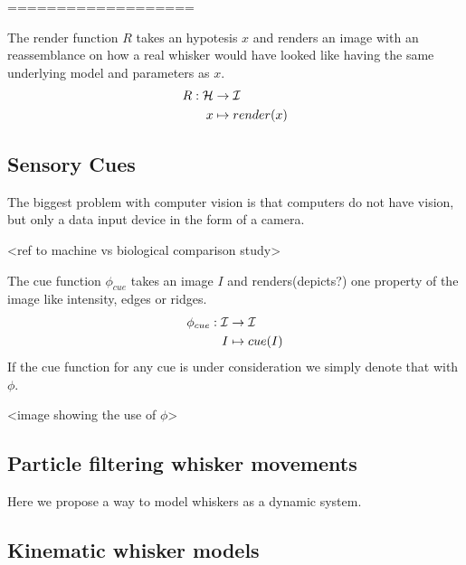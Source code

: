 ===================

\begin{definition}
    The render function $R$ takes an hypotesis $x$ and renders an image with an
    reassemblance on how a real whisker would have looked like having the same
    underlying model and parameters as $x$.
    \begin{equation}
        \begin{split}
            R : \mathcal{H} &\rightarrow \mathcal{I}\\
                x &\mapsto render(x)
        \end{split}
    \end{equation}
\end{definition}


\subsection{Sensory Cues}

The biggest problem with computer vision is that computers do not have
vision, but only a data input device in the form of a camera. 

<ref to machine vs biological comparison study>


\begin{definition}
    The cue function $\phi_{cue}$ takes an image $I$ and renders(depicts?) one property of the
    image like intensity, edges or ridges.
    \begin{equation}
        \begin{split}
            \phi_{cue} : \mathcal{I} &\rightarrow \mathcal{I}\\
                I &\mapsto cue(I)
        \end{split}
    \end{equation}
    If the cue function for any cue is under consideration we simply denote that with $\phi$.
\end{definition}


<image showing the use of $\phi$>


\subsection{Particle filtering whisker movements}
Here we propose a way to model whiskers as a dynamic system.

\subsection{Kinematic whisker models}

